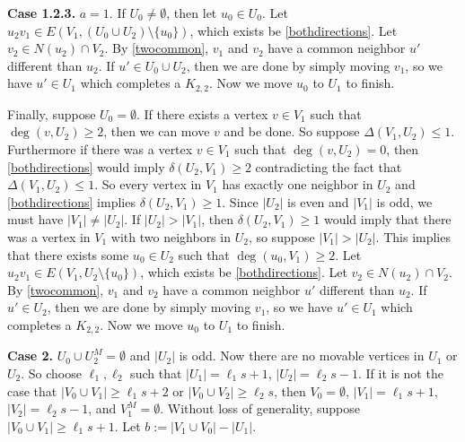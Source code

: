 \documentclass[oneside,12pt]{memoir}
\begin{document}
\textbf{Case 1.2.3.} $a=1$.  If $U_0\neq \emptyset$, then let $u_0\in U_0$.  Let $u_2v_1\in E(V_1, (U_0\cup U_2)\setminus \{u_0\})$, which exists be \eqref{bothdirections}.  Let $v_2\in N(u_2)\cap V_2$.  By \eqref{twocommon}, $v_1$ and $v_2$ have a common neighbor $u'$ different than $u_2$.  If $u'\in U_0\cup U_2$, then we are done by simply moving $v_1$, so we have $u'\in U_1$ which completes a $K_{2,2}$.  Now we move $u_0$ to $U_1$ to finish.

Finally, suppose $U_0=\emptyset$.  If there exists a vertex $v\in V_1$ such that $\deg(v, U_2)\geq 2$, then we can move $v$ and be done.  So suppose $\Delta(V_1, U_2)\leq 1$.  Furthermore if there was a vertex $v\in V_1$ such that $\deg(v, U_2)=0$, then \eqref{bothdirections} would imply $\delta(U_2, V_1)\geq 2$ contradicting the fact that $\Delta(V_1, U_2)\leq 1$.  So every vertex in $V_1$ has exactly one neighbor in $U_2$ and \eqref{bothdirections} implies $\delta(U_2, V_1)\geq 1$.  Since $|U_2|$ is even and $|V_1|$ is odd, we must have $|V_1|\neq |U_2|$.  If $|U_2|>|V_1|$, then $\delta(U_2, V_1)\geq 1$ would imply that there was a vertex in $V_1$ with two neighbors in $U_2$, so suppose $|V_1|>|U_2|$. This implies that there exists some $u_0\in U_2$ such that $\deg(u_0, V_1)\geq 2$. Let $u_2v_1\in E(V_1, U_2\setminus \{u_0\})$, which exists be \eqref{bothdirections}.  Let $v_2\in N(u_2)\cap V_2$.  By \eqref{twocommon}, $v_1$ and $v_2$ have a common neighbor $u'$ different than $u_2$.  If $u'\in U_2$, then we are done by simply moving $v_1$, so we have $u'\in U_1$ which completes a $K_{2,2}$.  Now we move $u_0$ to $U_1$ to finish.


\noindent
\textbf{Case 2.} $U_0\cup U_2^M= \emptyset$ and $|U_2|$ is odd.  Now there are no movable vertices in $U_1$ or $U_2$.  So choose $\ell_1, \ell_2$ such that $|U_1|=\ell_1s+1$, $|U_2|=\ell_2s-1$.  If it is not the case that $|V_0\cup V_1|\geq \ell_1s+2$ or $|V_0\cup V_2|\geq \ell_2s$, then $V_0=\emptyset$, $|V_1|=\ell_1s+1$, $|V_2|=\ell_2s-1$, and $V_1^M=\emptyset$.  Without loss of generality, suppose $|V_0\cup V_1|\geq \ell_1s+1$.  
Let $b:=|V_1\cup V_0|-|U_1|$.

\end{document}
